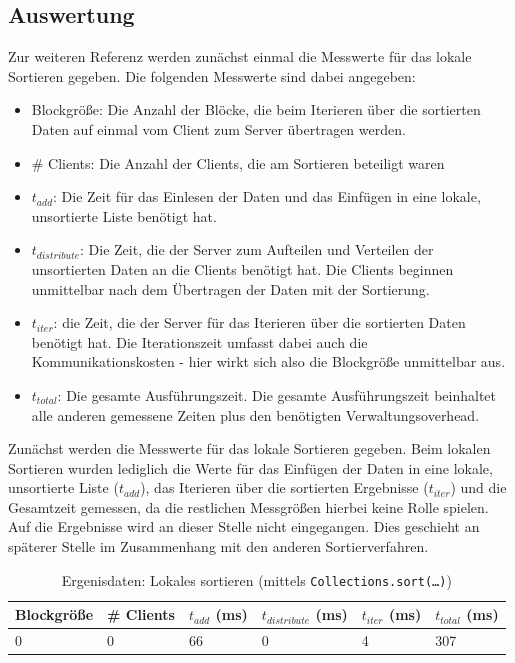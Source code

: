 \documentclass[fontsize=12pt,a4paper,headinclude=no,headings=small]{scrartcl}
\begin{document}
\subsection{Auswertung}
Zur weiteren Referenz werden zunächst einmal die Messwerte für das lokale Sortieren gegeben. 
Die folgenden Messwerte sind dabei angegeben:
\begin{itemize}
  \item Blockgröße: Die Anzahl der Blöcke, die beim Iterieren über die sortierten Daten auf einmal vom Client zum Server übertragen werden.
  \item \# Clients: Die Anzahl der Clients, die am Sortieren beteiligt waren
  \item $t_{add}$: Die Zeit für das Einlesen der Daten und das Einfügen in eine lokale, unsortierte Liste benötigt hat.
  \item $t_{distribute}$: Die Zeit, die der Server zum Aufteilen und Verteilen der unsortierten Daten an die Clients benötigt hat. Die Clients beginnen unmittelbar nach dem Übertragen der Daten mit der Sortierung.
  \item $t_{iter}$: die Zeit, die der Server für das Iterieren über die sortierten Daten benötigt hat. Die Iterationszeit umfasst dabei auch die Kommunikationskosten - hier wirkt sich also die Blockgröße unmittelbar aus.
  \item  $t_{total}$: Die gesamte Ausführungszeit. Die gesamte Ausführungszeit beinhaltet alle anderen gemessene Zeiten plus den benötigten Verwaltungsoverhead.  
\end{itemize}

Zunächst werden die Messwerte für das lokale Sortieren gegeben. Beim lokalen Sortieren wurden lediglich die Werte für das Einfügen der Daten in eine lokale, unsortierte Liste ($t_{add}$), das Iterieren über die sortierten Ergebnisse ($t_{iter}$) und die Gesamtzeit gemessen, da die restlichen Messgrößen hierbei keine Rolle spielen. Auf die Ergebnisse wird an dieser Stelle nicht eingegangen. Dies geschieht an späterer Stelle im Zusammenhang mit den anderen Sortierverfahren. 
\begin{table}[htp]
\begin{tabularx}{\textwidth}{ |X|X|X|X|X|X| }
\hline
Blockgröße & \# Clients & $t_{add}$ (ms) & $t_{distribute}$ (ms) & $t_{iter}$ (ms) & $t_{total}$ (ms) \\
\hline
0 & 0 & 66 & 0 & 4 & 307 \\
\hline
\end{tabularx}
\caption{Ergenisdaten: Lokales sortieren (mittels \texttt{Collections.sort(\ldots)})}
\end{table}
\end{document}
